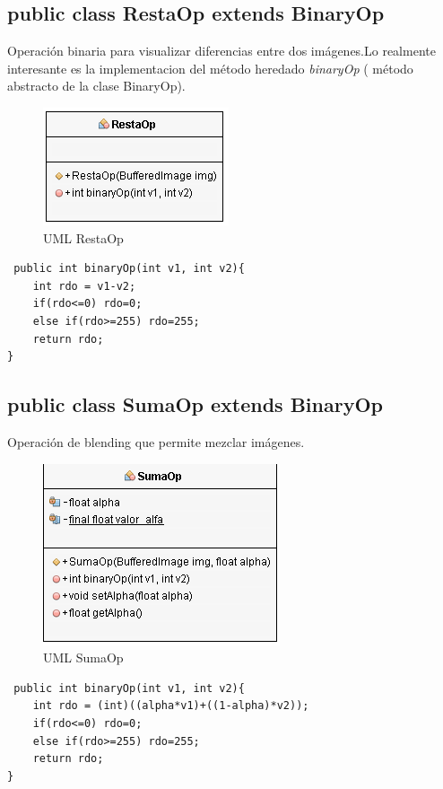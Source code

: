 \subsection*{public class RestaOp extends BinaryOp}
Operación binaria para visualizar diferencias entre dos imágenes.Lo realmente interesante es la implementacion del método heredado \emph{binaryOp} ( método abstracto de la clase BinaryOp).

\begin{figure}[H]
  \centering
    \includegraphics[scale=0.75]{images/resta}
  \caption{UML RestaOp}
  \label{UML RestaOp}
\end{figure}

\begin{lstlisting}
 public int binaryOp(int v1, int v2){
    int rdo = v1-v2;
    if(rdo<=0) rdo=0;
    else if(rdo>=255) rdo=255;
    return rdo;
}
\end{lstlisting}

\subsection*{public class SumaOp extends BinaryOp}
Operación de blending que permite mezclar imágenes.

\begin{figure}[H]
  \centering
    \includegraphics[scale=0.75]{images/suma}
  \caption{UML SumaOp}
  \label{UML SumaOp}
\end{figure}

\begin{lstlisting}
 public int binaryOp(int v1, int v2){
    int rdo = (int)((alpha*v1)+((1-alpha)*v2));
    if(rdo<=0) rdo=0;
    else if(rdo>=255) rdo=255;
    return rdo;
}
\end{lstlisting}

